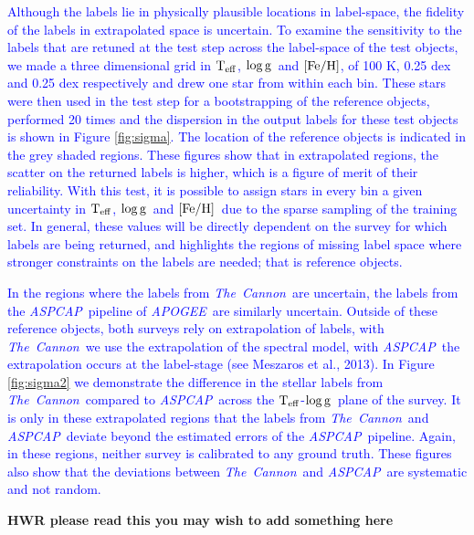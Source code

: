 \documentclass[12pt, preprint]{aastex}
\newcommand{\tc}{\textsl{The~Cannon}}
\newcommand{\apogee}{\textsl{APOGEE}}
\newcommand{\aspcap}{\textsl{ASPCAP}}
\newcommand{\teff}{\mbox{$\rm T_{eff}$}}
\newcommand{\feh}{\mbox{$\rm [Fe/H]$}}
\newcommand{\logg}{\mbox{$\rm \log g$}}
\begin{document}
\textcolor{blue}{Although the labels lie in physically plausible locations in label-space, the fidelity of the labels in extrapolated space is uncertain. To examine the sensitivity to the labels that are retuned at the test step across the label-space of the test objects, we made a three dimensional grid in \teff, \logg\ and \feh, of 100 K, 0.25 dex and 0.25 dex respectively and drew one star from within each bin. These stars were then used in the test step for a bootstrapping of the reference objects, performed 20 times and the dispersion in the output labels for these test objects is shown in Figure \ref{fig:sigma}. The location of the reference objects is indicated in the grey shaded regions. These figures show that in extrapolated regions, the scatter on the returned labels is higher, which is a figure of merit of their reliability. With this test, it is possible to assign stars in every bin a given uncertainty in \teff, \logg\ and \feh\ due to the sparse sampling of the training set. In general, these values will be directly dependent on the survey for which labels are being returned, and highlights the regions of missing label space where stronger constraints on the labels are needed; that is reference objects. }

\textcolor{blue}{In the regions where the labels from \tc\ are uncertain, the labels from the \aspcap\ pipeline of \apogee\ are similarly uncertain. Outside of these reference objects, both surveys rely on extrapolation of labels, with \tc\ we use the extrapolation of the spectral model, with \aspcap\ the extrapolation occurs at the label-stage (see Meszaros et al., 2013). In Figure \ref{fig:sigma2} we demonstrate the difference in the stellar labels from \tc\ compared to \aspcap\ across the \teff-\logg\ plane of the survey. It is only in these extrapolated regions that the labels from \tc\ and \aspcap\ deviate beyond the estimated errors of the \aspcap\ pipeline. Again, in these regions, neither survey is calibrated to any ground truth. These figures also show that the deviations between \tc\ and \aspcap\ are systematic and not random. }

\textbf{HWR please read this you may wish to add something here} 
\end{document}
